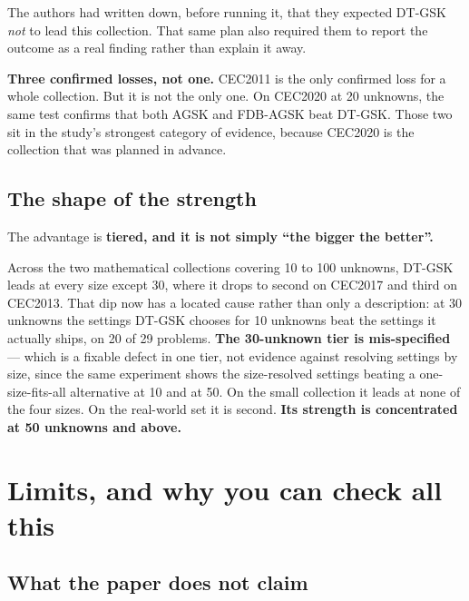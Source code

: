 \documentclass[11pt,a4paper]{article}
\newcommand{\hl}[1]{\textbf{#1}}
\begin{document}
The authors had written down, before running it, that they expected DT-GSK
\emph{not} to lead this collection. That same plan also required them to report
the outcome as a real finding rather than explain it away.

\hl{Three confirmed losses, not one.} CEC2011 is the only confirmed loss for a
whole collection. But it is not the only one. On CEC2020 at 20 unknowns, the same
test confirms that both AGSK and FDB-AGSK beat DT-GSK. Those two sit in the
study's strongest category of evidence, because CEC2020 is the collection that
was planned in advance.

\subsection{The shape of the strength}

The advantage is \hl{tiered, and it is not simply ``the bigger the better''.}

Across the two mathematical collections covering 10 to 100 unknowns, DT-GSK
leads at every size except 30, where it drops to second on CEC2017 and third on
CEC2013. That dip now has a located cause rather than only a description: at 30
unknowns the settings DT-GSK chooses for 10 unknowns beat the settings it
actually ships, on 20 of 29 problems. \hl{The 30-unknown tier is mis-specified}
--- which is a fixable defect in one tier, not evidence against resolving
settings by size, since the same experiment shows the size-resolved settings
beating a one-size-fits-all alternative at 10 and at 50. On the small collection
it leads at none of the four sizes. On the real-world set it is second.
\hl{Its strength is concentrated at 50 unknowns and above.}

\section{Limits, and why you can check all this}

\subsection{What the paper does not claim}
\end{document}
